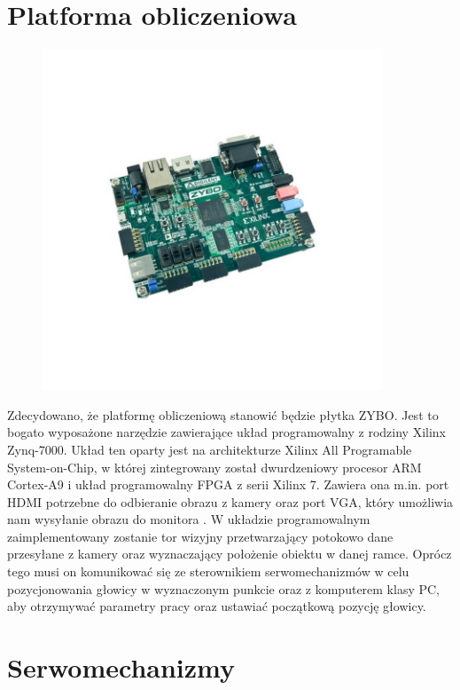 \section{Platforma obliczeniowa}
\label{sec:platformaobliczeniowa}

\begin{figure}[H]
	\centering
	\includegraphics[width=4in]{zybo.jpg}
\end{figure}

Zdecydowano, że platformę obliczeniową stanowić będzie płytka ZYBO. Jest to bogato wyposażone narzędzie zawierające układ programowalny z rodziny Xilinx Zynq-7000. Układ ten oparty jest na architekturze Xilinx All Programable System-on-Chip, w której zintegrowany został dwurdzeniowy procesor ARM Cortex-A9 i układ programowalny FPGA z serii Xilinx 7. Zawiera ona m.in. port HDMI potrzebne do odbieranie obrazu z kamery oraz port VGA, który umożliwia nam wysyłanie obrazu do monitora \cite{Xi}. W układzie programowalnym zaimplementowany zostanie tor wizyjny przetwarzający potokowo dane przesyłane z kamery oraz wyznaczający położenie obiektu w danej ramce. Oprócz tego musi on komunikować się ze sterownikiem serwomechanizmów w celu pozycjonowania głowicy w wyznaczonym punkcie oraz z komputerem klasy PC, aby otrzymywać parametry pracy oraz ustawiać początkową pozycję głowicy.

\section{Serwomechanizmy}
\label{sec:serwomechanizmy}

